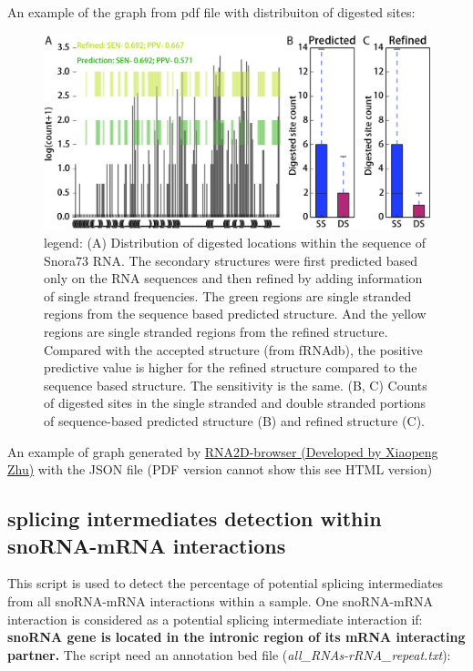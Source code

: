 \documentclass[letterpaper,10pt,english]{sphinxmanual}
\begin{document}
An example of the graph from pdf file with distribuiton of digested sites:
\begin{figure}[htbp]
\centering
\capstart

\includegraphics{Snora73_digestedSite.jpg}
\caption{legend: (A) Distribution of digested locations within the sequence of Snora73 RNA. The secondary structures were first predicted based only on the RNA sequences and then refined by adding information of single strand frequencies. The green regions are single stranded regions from the sequence based predicted structure. And the yellow regions are single stranded regions from the refined structure. Compared with the accepted structure (from fRNAdb), the positive predictive value is higher for the refined structure compared to the sequence based structure. The sensitivity is the same. (B, C) Counts of digested sites in the single stranded and double stranded portions of sequence-based predicted structure (B) and refined structure (C).}\end{figure}

An example of graph generated by \href{http://circos.zhu.land/}{RNA2D-browser (Developed by Xiaopeng Zhu)} with the JSON file (PDF version cannot show this see HTML version)


\subsection{splicing intermediates detection within snoRNA-mRNA interactions}
\label{Analysis_pipeline:snorna-mrna}\label{Analysis_pipeline:splicing-intermediates-detection-within-snorna-mrna-interactions}
This script is used to detect the percentage of potential splicing intermediates from all snoRNA-mRNA interactions within a sample. One snoRNA-mRNA interaction is considered as a potential splicing intermediate interaction if: \textbf{snoRNA gene is located in the intronic region of its mRNA interacting partner.} The script need an annotation bed file (\emph{all\_RNAs-rRNA\_repeat.txt}):
\end{document}
